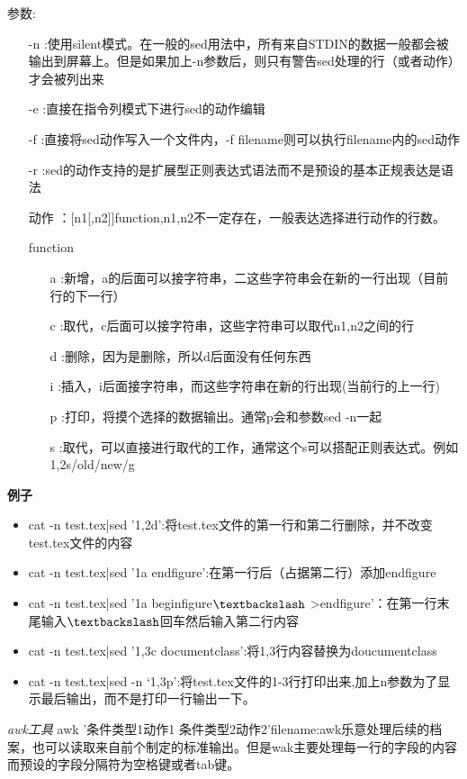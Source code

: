 \documentclass{book}
\begin{document}
参数:
\begin{itemize}
	\item[-n]:使用silent模式。在一般的sed用法中，所有来自STDIN的数据一般都会被输出到屏幕上。但是如果加上-n参数后，则只有警告sed处理的行（或者动作）才会被列出来
	\item[-e]:直接在指令列模式下进行sed的动作编辑
	\item[-f]:直接将sed动作写入一个文件内，-f filename则可以执行filename内的sed动作
	\item[-r]:sed的动作支持的是扩展型正则表达式语法而不是预设的基本正规表达是语法
	\item[动作]：[n1[,n2]]function,n1,n2不一定存在，一般表达选择进行动作的行数。
	\item[function]
		\begin{itemize}
			\item[a]:新增，a的后面可以接字符串，二这些字符串会在新的一行出现（目前行的下一行）
			\item[c]:取代，c后面可以接字符串，这些字符串可以取代n1,n2之间的行
			\item[d]:删除，因为是删除，所以d后面没有任何东西
			\item[i]:插入，i后面接字符串，而这些字符串在新的行出现(当前行的上一行)
			\item[p]:打印，将摸个选择的数据输出。通常p会和参数sed -n一起
			\item[s]:取代，可以直接进行取代的工作，通常这个s可以搭配正则表达式。例如1,2s/old/new/g
		\end{itemize}
\end{itemize}
\textbf{例子}
\begin{itemize}
\item cat -n test.tex|sed '1,2d':将test.tex文件的第一行和第二行删除，并不改变test.tex文件的内容

\item cat -n test.tex|sed '1a end{figure}':在第一行后（占据第二行）添加end{figure}
\item cat -n test.tex|sed '1a begin{figure}$\textbackslash$
	>end{figure}'：在第一行末尾输入$\textbackslash$回车然后输入第二行内容
\item cat -n test.tex|sed '1,3c documentclass':将1,3行内容替换为doucumentclass
\item cat -n test.tex|sed -n ‘1,3p’:将test.tex文件的1-3行打印出来,加上n参数为了显示最后输出，而不是打印一行输出一下。
\end{itemize}
\textit{awk工具}
awk '条件类型1{动作1} 条件类型2{动作2}'filename:awk乐意处理后续的档案，也可以读取来自前个制定的标准输出。但是wak主要处理每一行的字段的内容而预设的字段分隔符为空格键或者tab键。
\end{document}
